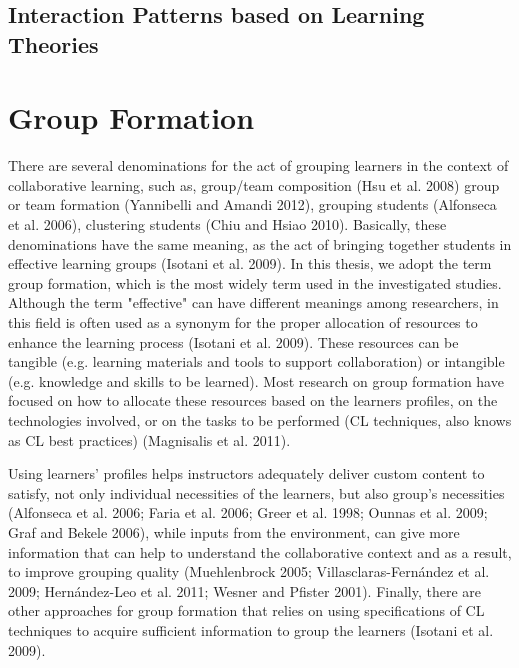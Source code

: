 \subsection{Interaction Patterns based on Learning Theories}

\section{Group Formation}
There are several denominations for the act of grouping learners in the context of collaborative learning, such as, group/team composition (Hsu et al. 2008) group or team formation (Yannibelli and Amandi 2012), grouping students (Alfonseca et al. 2006), clustering students (Chiu and Hsiao 2010).
Basically, these denominations have the same meaning, as the act of bringing together students in effective learning groups (Isotani et al. 2009). 
In this thesis, we adopt the term group formation, which is the most widely term used in the investigated studies.
Although the term "effective" can have different meanings among researchers, in this field is often used as a synonym for the proper allocation of resources to enhance the learning process (Isotani et al. 2009). 
These resources can be tangible (e.g. learning materials and tools to support collaboration) or intangible (e.g. knowledge and skills to be learned). 
Most research on group formation have focused on how to allocate these resources based on the learners profiles, on the technologies involved, or on the tasks to be performed (CL techniques, also knows as CL best practices) (Magnisalis et al. 2011).

Using learners' profiles helps instructors adequately deliver custom content to satisfy, not only individual necessities of the learners, but also group's necessities (Alfonseca et al. 2006; Faria et al. 2006; Greer et al. 1998; Ounnas et al. 2009; Graf and Bekele 2006), while inputs from the environment, can give more information that can help to understand the collaborative context and as a result, to improve grouping quality (Muehlenbrock 2005; Villasclaras-Fernández et al. 2009; Hernández-Leo et al. 2011; Wesner and Pfister 2001). 
Finally, there are other approaches for group formation that relies on using specifications of CL techniques to acquire sufficient information to group the learners (Isotani et al. 2009).

